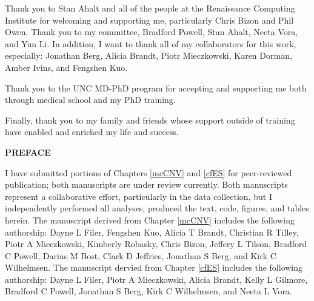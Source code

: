 \documentclass[11pt,letterpaper,oneside]{book}
\newcommand{\mytwoin}[1]{
\vspace*{0.6875in}
\begin{center}
\bfseries\MakeUppercase{#1}
\end{center}
}
\begin{document}
  Thank you to Stan Ahalt and all of the people at the Renaissance Computing Institute for welcoming and supporting me, particularly Chris Bizon and Phil Owen.
  Thank you to my committee, Bradford Powell, Stan Ahalt, Neeta Vora, and Yun Li.
  In addition, I want to thank all of my collaborators for this work, especially: Jonathan Berg, Alicia Brandt, Piotr Mieczkowski, Karen Dorman, Amber Ivins, and Fengshen Kuo.

  Thank you to the UNC MD-PhD program for accepting and supporting me both through medical school and my PhD training.

  Finally, thank you to my family and friends whose support outside of training have enabled and enriched my life and success.

  \clearpage
  \mytwoin{Preface}
  
  I have submitted portions of Chapters \ref{mcCNV} and \ref{cfES} for peer-reviewed publication; both manuscripts are under review currently.
  Both manuscripts represent a collaborative effort, particularly in the data collection, but I independently performed all analyses, produced the text, code, figures, and tables herein.
  The manuscript derived from Chapter \ref{mcCNV} includes the following authorship: Dayne L Filer, Fengshen Kuo, Alicia T Brandt, Christian R Tilley, Piotr A Mieczkowski, Kimberly Robasky, Chris Bizon, Jeffery L Tilson, Bradford C Powell, Darius M Bost, Clark D Jeffries, Jonathan S Berg, and Kirk C Wilhelmsen.
  The manuscript dervied from Chapter \ref{cfES} includes the following authorship: Dayne L Filer, Piotr A Mieczkowski, Alicia Brandt, Kelly L Gilmore, Bradford C Powell, Jonathan S Berg, Kirk C Wilhelmsen, and Neeta L Vora.

\clearpage

\tableofcontents


\newpage
{}
{}
\listoffigures

\newpage
{}
{}
\listoftables
\end{document}
